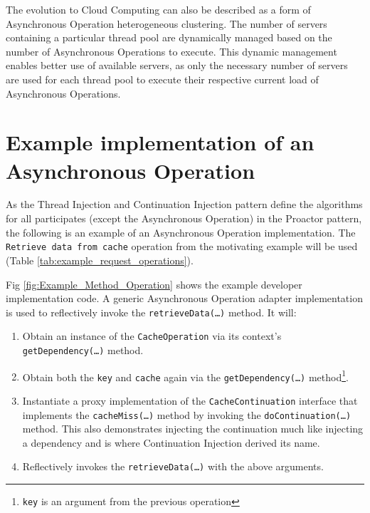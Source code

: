 \documentclass[prodmode]{style/acmlarge}
\begin{document}
The evolution to Cloud Computing can also be described as a form of Asynchronous
Operation heterogeneous clustering.  The number of servers containing a
particular thread pool are dynamically managed based on the number of
Asynchronous Operations to execute.  This dynamic management enables better use
of available servers, as only the necessary number of servers are used for each
thread pool to execute their respective current load of Asynchronous Operations.


\section{Example implementation of an Asynchronous Operation}

As the Thread Injection and Continuation Injection pattern define the algorithms
for all participates (except the Asynchronous Operation) in the Proactor
pattern, the following is an example of an Asynchronous Operation
implementation.  The \texttt{Retrieve data from cache} operation from the
motivating example will be used (Table \ref{tab:example_request_operations}).

Fig \ref{fig:Example_Method_Operation} shows the example developer
implementation code.  A generic Asynchronous Operation adapter implementation is
used to reflectively invoke the \texttt{retrieveData(\ldots)} method. It will:
\begin{enumerate}
  \item Obtain an instance of the \texttt{CacheOperation} via its context's \texttt{getDependency(\ldots)} method.
  \item Obtain both the \texttt{key} and \texttt{cache} again via the \texttt{getDependency(\ldots)} method\footnote{\texttt{key} is an argument from the previous operation}.
  \item Instantiate a proxy implementation of the \texttt{CacheContinuation} interface that implements the \texttt{cacheMiss(\ldots)} method by invoking the \texttt{doContinuation(\ldots)} method.  This also demonstrates injecting the continuation much like injecting a dependency and is where Continuation Injection derived its name. 
  \item Reflectively invokes the \texttt{retrieveData(\ldots)} with the above arguments.
\end{enumerate}
\end{document}
